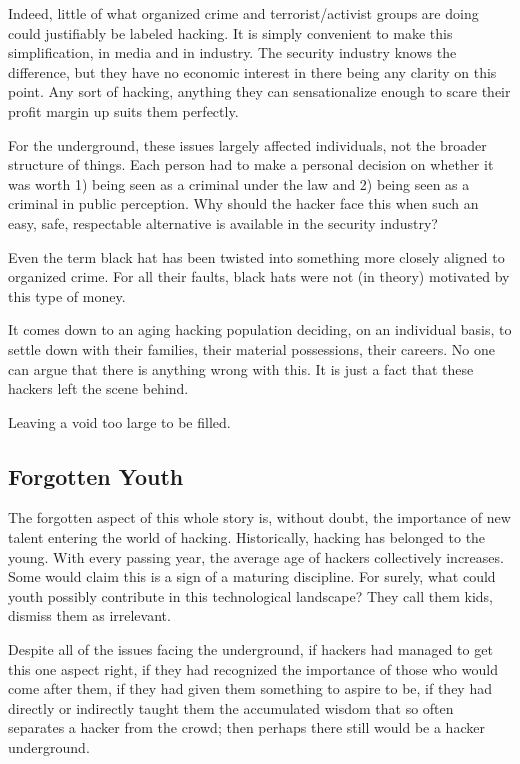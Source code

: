 \documentclass[letterpaper,12pt,english]{sphinxmanual}
\begin{document}
Indeed, little of what organized crime and terrorist/activist groups
are doing could justifiably be labeled hacking. It is simply convenient
to make this simplification, in media and in industry. The security
industry knows the difference, but they have no economic interest in
there being any clarity on this point. Any sort of hacking, anything
they can sensationalize enough to scare their profit margin up suits
them perfectly.

For the underground, these issues largely affected individuals, not the
broader structure of things. Each person had to make a personal decision
on whether it was worth 1) being seen as a criminal under the law and
2) being seen as a criminal in public perception. Why should the hacker
face this when such an easy, safe, respectable alternative is available
in the security industry?

Even the term black hat has been twisted into something more closely
aligned to organized crime. For all their faults, black hats were not
(in theory) motivated by this type of money.

It comes down to an aging hacking population deciding, on an individual
basis, to settle down with their families, their material possessions,
their careers. No one can argue that there is anything wrong with this. It
is just a fact that these hackers left the scene behind.

Leaving a void too large to be filled.


\subsection{Forgotten Youth}
\label{underground-myth:forgotten-youth}
The forgotten aspect of this whole story is, without doubt, the importance
of new talent entering the world of hacking. Historically, hacking has
belonged to the young. With every passing year, the average age of hackers
collectively increases. Some would claim this is a sign of a maturing
discipline. For surely, what could youth possibly contribute in this
technological landscape? They call them kids, dismiss them as irrelevant.

Despite all of the issues facing the underground, if hackers had managed
to get this one aspect right, if they had recognized the importance
of those who would come after them, if they had given them something
to aspire to be, if they had directly or indirectly taught them the
accumulated wisdom that so often separates a hacker from the crowd;
then perhaps there still would be a hacker underground.
\end{document}
